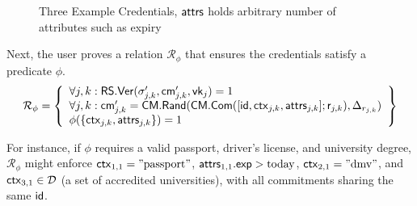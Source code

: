 \begin{figure}
        \begin{pchstack}[boxed, center, space=4em]
            \begin{pcvstack}
            \end{pcvstack}
            \pcvspace
            \begin{pcvstack}
            \end{pcvstack}
            \pcvspace
            \begin{pcvstack}
            \end{pcvstack}
        \end{pchstack}
    \caption{Three Example Credentials, $\mathsf{attrs}$ holds arbitrary number of attributes such as expiry}
    \label{fig:three-creds}
\end{figure}

Next, the user proves a relation $\mathcal{R}_\phi$ that ensures the credentials satisfy a predicate $\phi$. 
\[
\mathcal{R}_\phi = \left\{ 
\begin{array}{l} 
\forall j, k: \mathsf{RS.Ver}(\sigma_{j,k}', \mathsf{cm}_{j,k}', \mathsf{vk}_j) = 1 \\ 
\forall j, k: \mathsf{cm}_{j,k}' = \mathsf{CM.Rand}(\mathsf{CM.Com}([\mathsf{id}, \mathsf{ctx}_{j,k}, \mathsf{attrs}_{j,k}]; \mathsf{r}_{j,k}), \Delta_{r_{j,k}}) \\ 
\phi(\{\mathsf{ctx}_{j,k}, \mathsf{attrs}_{j,k}\}) = 1 
\end{array} 
\right\}
\]

For instance, if $\phi$ requires a valid passport, driver’s license, and university degree, $\mathcal{R}_\phi$ might enforce $\mathsf{ctx}_{1,1} = \text{''passport''}$, $\mathsf{attrs}_{1,1}.\mathsf{exp} > \text{today}$, $\mathsf{ctx}_{2,1} = \text{''dmv''}$, and $\mathsf{ctx}_{3,1} \in \mathcal{D}$ (a set of accredited universities), with all commitments sharing the same $\mathsf{id}$.

